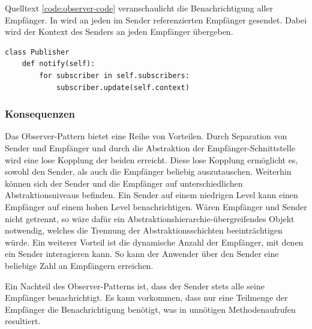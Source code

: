 Quelltext \ref{code:observer-code} veranschaulicht die Benachrichtigung aller Empfänger. In  wird an jeden im Sender referenzierten Empfänger  gesendet. Dabei wird der Kontext des Senders an jeden Empfänger übergeben.

\lstset{language=python}
\begin{lstlisting}[caption={Quelltext der Methode \code{notify} des Publishers, welche über alle Empfänger iteriert und diese benachrichtigt.}, label=code:observer-code]
class Publisher
	def notify(self):
        for subscriber in self.subscribers:
            subscriber.update(self.context)
\end{lstlisting}


\subsubsection*{Konsequenzen}

Das Observer-Pattern bietet eine Reihe von Vorteilen. Durch Separation von Sender und Empfänger und durch die Abstraktion der Empfänger-Schnittstelle wird eine lose Kopplung der beiden erreicht. Diese lose Kopplung ermöglicht es, sowohl den Sender, als auch die Empfänger beliebig auszutauschen. Weiterhin können sich der Sender und die Empfänger auf unterschiedlichen Abstraktionsniveaus befinden. Ein Sender auf einem niedrigen Level kann einen Empfänger auf einem hohen Level benachrichtigen. Wären Empfänger und Sender nicht getrennt, so wäre dafür ein Abstraktionshierarchie-übergreifendes Objekt notwendig, welches die Trennung der Abstraktionsschichten beeinträchtigen würde. Ein weiterer Vorteil ist die dynamische Anzahl der Empfänger, mit denen ein Sender interagieren kann. So kann der Anwender über den Sender eine beliebige Zahl an Empfängern erreichen.

Ein Nachteil des Observer-Patterns ist, dass der Sender stets alle seine Empfänger benachrichtigt. Es kann vorkommen, dass nur eine Teilmenge der Empfänger die Benachrichtigung benötigt, was in unnötigen Methodenaufrufen resultiert. \cite{gamma_design_1995}